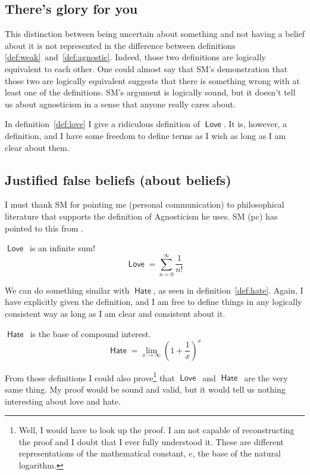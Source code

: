 \documentclass[12pt]{article}
\newcommand{\rel}[1]{\ensuremath{\mathop{\mathsf{#1}}}}
\newcommand{\rllove}{\rel{Love}}
\newcommand{\rlhate}{\rel{Hate}}
\begin{document}
\subsection{There's glory for you}

This distinction between being uncertain about something and not having a belief about it
is not represented in the difference between definitions \ref{def:weak}~and~\ref{def:agnostic}.
Indeed, those two definitions are logically equivalent to each other.
One could almost say that SM's demonstration that those two are logically equivalent suggests that there is something wrong with at least one of the definitions.
SM's argument is logically sound, but it doesn't tell us about agnosticism in a sense that anyone really cares about.

In definition~\ref{def:love} I give a ridiculous definition of \rllove.
It is, however, a definition, and I have some freedom to define terms as I wish as long as I am clear about them.

\subsection{Justified false beliefs (about beliefs)}

I must thank SM for pointing me (personal communication) to philosophical literature that supports the definition of Agnosticism he uses.
SM (pc) has pointed to this from \cite{sep-atheism-agnosticism}.



\begin{definition}\label{def:love}
    \rllove\ is an infinite sum!
    \[
     \rllove = \sum_{n=0}^\infty \frac{1}{n!}   
    \]   
\end{definition}

We can do something similar with \rlhate, as seen in definition~\ref{def:hate}.
Again, I have explicitly given the definition, and I am free to define things in any logically consistent way as long as I am clear and consistent about it.

\begin{definition}\label{def:hate}
    \rlhate\ is the base of compound interest.
    \[
     \rlhate =  \lim_{x \to \infty}\left( 1 + \frac{1}{x}\right)^x 
    \]   
\end{definition}

From those definitions I could also prove\footnote{%
    Well, I would have to look up the proof.
    I am not capable of reconstructing the proof and I doubt that I ever fully understood it.
    These are different representations of the mathematical constant,
    $e$, the base of the natural logarithm.}
that \rllove\ and \rlhate\ are the very same thing.
My proof would be sound and valid, but it would tell us nothing interesting about love and hate.
\end{document}

